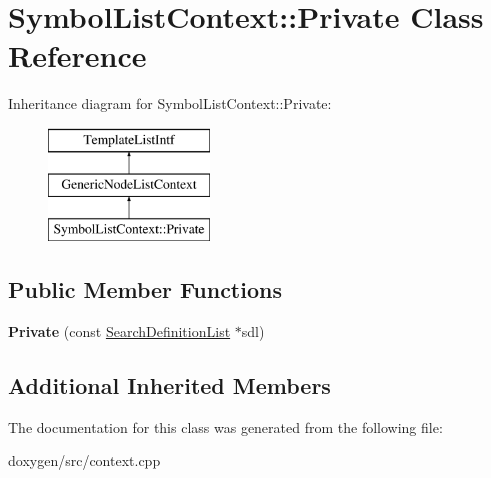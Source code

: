 \hypertarget{class_symbol_list_context_1_1_private}{}\section{Symbol\+List\+Context\+::Private Class Reference}
\label{class_symbol_list_context_1_1_private}
Inheritance diagram for Symbol\+List\+Context\+::Private\+:\begin{figure}[H]
\begin{center}
\leavevmode
\includegraphics[height=3.000000cm]{class_symbol_list_context_1_1_private}
\end{center}
\end{figure}
\subsection*{Public Member Functions}
\begin{DoxyCompactItemize}
\item 
\mbox{\label{class_symbol_list_context_1_1_private_a5cf28c9765e74def03bf604bf17b1dd7}} 
{\bfseries Private} (const \mbox{\hyperlink{class_search_definition_list}{Search\+Definition\+List}} $\ast$sdl)
\end{DoxyCompactItemize}
\subsection*{Additional Inherited Members}


The documentation for this class was generated from the following file\+:\begin{DoxyCompactItemize}
\item 
doxygen/src/context.\+cpp\end{DoxyCompactItemize}

